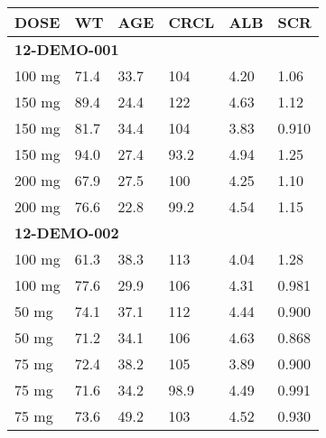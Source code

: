 {\def\arraystretch{1.4}\tabcolsep=5pt
\begin{threeparttable}
\begin{tabular}[h]{llllll}
\hline
DOSE & WT & AGE & CRCL & ALB & SCR \\
\hline
\multicolumn{6}{l}{\textbf{12-DEMO-001}}\\
100 mg & 71.4 & 33.7 & 104 & 4.20 & 1.06 \\
150 mg & 89.4 & 24.4 & 122 & 4.63 & 1.12 \\
150 mg & 81.7 & 34.4 & 104 & 3.83 & 0.910 \\
150 mg & 94.0 & 27.4 & 93.2 & 4.94 & 1.25 \\
200 mg & 67.9 & 27.5 & 100 & 4.25 & 1.10 \\
200 mg & 76.6 & 22.8 & 99.2 & 4.54 & 1.15 \\
\hline \multicolumn{6}{l}{\textbf{12-DEMO-002}}\\
100 mg & 61.3 & 38.3 & 113 & 4.04 & 1.28 \\
100 mg & 77.6 & 29.9 & 106 & 4.31 & 0.981 \\
50 mg & 74.1 & 37.1 & 112 & 4.44 & 0.900 \\
50 mg & 71.2 & 34.1 & 106 & 4.63 & 0.868 \\
75 mg & 72.4 & 38.2 & 105 & 3.89 & 0.900 \\
75 mg & 71.6 & 34.2 & 98.9 & 4.49 & 0.991 \\
75 mg & 73.6 & 49.2 & 103 & 4.52 & 0.930 \\
\hline
\end{tabular}
\end{threeparttable}
}
